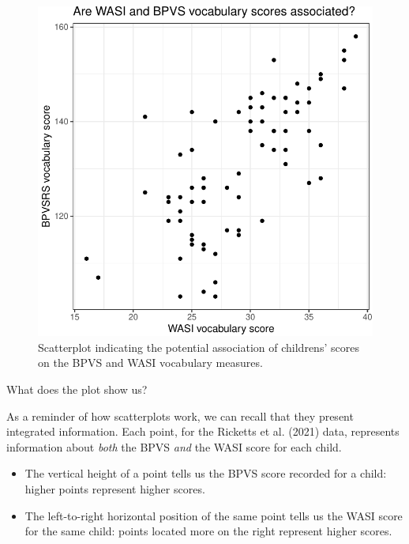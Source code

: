 \documentclass[
  letterpaper,
  DIV=11,
  numbers=noendperiod]{scrreprt}
\providecommand{\tightlist}{%
  \setlength{\itemsep}{0pt}\setlength{\parskip}{0pt}}\usepackage{longtable,booktabs,array}
\begin{document}
\begin{figure}[H]

{\centering \includegraphics{visualization_files/figure-pdf/fig-scatter-BPVS-WASI-1.pdf}

}

\caption{\label{fig-scatter-BPVS-WASI}Scatterplot indicating the
potential association of childrens' scores on the BPVS and WASI
vocabulary measures.}

\end{figure}

What does the plot show us?

As a reminder of how scatterplots work, we can recall that they present
integrated information. Each point, for the Ricketts et al. (2021) data,
represents information about \emph{both} the BPVS \emph{and} the WASI
score for each child.

\begin{itemize}
\tightlist
\item
  The vertical height of a point tells us the BPVS score recorded for a
  child: higher points represent higher scores.
\item
  The left-to-right horizontal position of the same point tells us the
  WASI score for the same child: points located more on the right
  represent higher scores.
\end{itemize}
\end{document}
